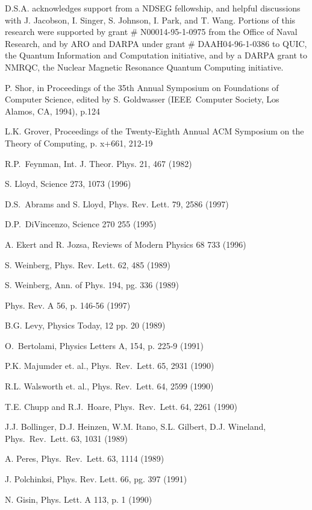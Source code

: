 \documentclass[12pt]{article}
\begin{document}
D.S.A. acknowledges support from a NDSEG fellowship, and helpful discussions
with J. Jacobson, I. Singer, S. Johnson, I. Park, and T. Wang. Portions of
this research were supported by grant \# N00014-95-1-0975 from the Office of
Naval Research, and by ARO and DARPA under grant \# DAAH04-96-1-0386 to QUIC,
the Quantum Information and Computation initiative, and by a DARPA grant to
NMRQC, the Nuclear Magnetic Resonance Quantum Computing initiative.

\pagebreak 

\begin{thebibliography}{99}
P. Shor, in Proceedings of the 35th Annual Symposium on
Foundations of Computer Science, edited by S. Goldwasser (IEEE\ Computer
Society, Los Alamos, CA, 1994), p.124

L.K. Grover, Proceedings of the Twenty-Eighth Annual ACM
Symposium on the Theory of Computing, p. x+661, 212-19

R.P.\ Feynman, Int. J. Theor. Phys. 21, 467 (1982)

S. Lloyd, Science 273, 1073 (1996)

D.S.\ Abrams and S. Lloyd, Phys. Rev. Lett. 79, 2586 (1997)

D.P.\ DiVincenzo, Science 270 255 (1995)

A. Ekert and R. Jozsa, Reviews of Modern Physics 68 733 (1996)

S. Weinberg, Phys. Rev. Lett. 62, 485 (1989)

S. Weinberg, Ann. of Phys. 194, pg. 336 (1989)

Phys. Rev. A 56, p. 146-56 (1997)

B.G. Levy, Physics Today, 12 pp. 20 (1989)

O.\ Bertolami, Physics Letters A, 154, p. 225-9 (1991)

P.K. Majumder et. al., Phys.\ Rev.\ Lett. 65, 2931 (1990)

R.L. Walsworth et. al., Phys. Rev.\ Lett. 64, 2599 (1990)

T.E. Chupp and R.J.\ Hoare, Phys.\ Rev.\ Lett. 64, 2261 (1990)

J.J. Bollinger, D.J. Heinzen, W.M. Itano, S.L. Gilbert,
D.J. Wineland, Phys.\ Rev.\ Lett. 63, 1031 (1989)

A. Peres, Phys.\ Rev.\ Lett. 63, 1114 (1989)

J. Polchinksi, Phys. Rev. Lett. 66, pg. 397 (1991)

N. Gisin, Phys. Lett. A 113, p. 1 (1990)
\end{thebibliography}
\end{document}
